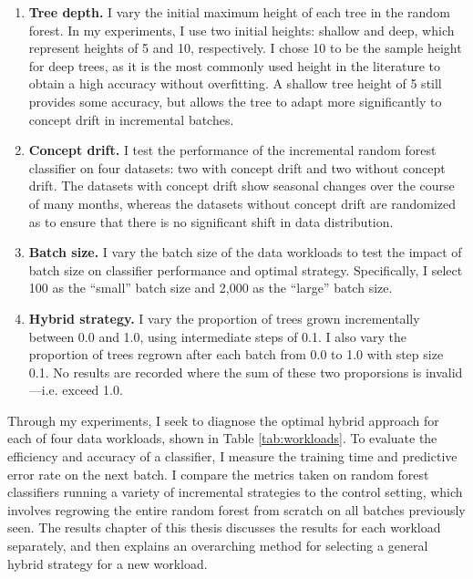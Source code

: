 \begin{enumerate}

    \item \textbf{Tree depth.} I vary the initial maximum height of each tree
      in the random forest. In my experiments, I use two initial heights:
      shallow and deep, which represent heights of 5 and 10, respectively. I
      chose 10 to be the sample height for deep trees, as it is the most
      commonly used height in the literature to obtain a high accuracy without
      overfitting. A shallow tree height of 5 still provides some accuracy, but
      allows the tree to adapt more significantly to concept drift in
      incremental batches.

    \item \textbf{Concept drift.} I test the performance of the incremental
      random forest classifier on four datasets: two with concept drift and two
      without concept drift. The datasets with concept drift show seasonal
      changes over the course of many months, whereas the datasets without
      concept drift are randomized as to ensure that there is no significant
      shift in data distribution.

    \item \textbf{Batch size.} I vary the batch size of the data workloads to
      test the impact of batch size on classifier performance and optimal
      strategy. Specifically, I select 100 as the ``small'' batch size and
      2,000 as the ``large'' batch size. 

    \item \textbf{Hybrid strategy.} I vary the proportion of trees grown
      incrementally between 0.0 and 1.0, using intermediate steps of 0.1. I
      also vary the proportion of trees regrown after each batch from 0.0 to
      1.0 with step size 0.1. No results are recorded where the sum of these two
      proporsions is invalid---i.e. exceed 1.0. 
\end{enumerate}

Through my experiments, I seek to diagnose the optimal hybrid approach for each
of four data workloads, shown in Table \ref{tab:workloads}. To evaluate the
efficiency and accuracy of a classifier, I measure the training time and
predictive error rate on the next batch. I compare the metrics taken on random
forest classifiers running a variety of incremental strategies to the control
setting, which involves regrowing the entire random forest from scratch on all
batches previously seen. The results chapter of this thesis discusses the
results for each workload separately, and then explains an overarching method
for selecting a general hybrid strategy for a new workload.

